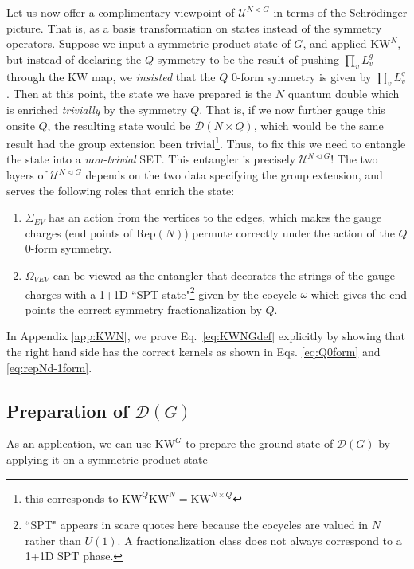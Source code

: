 \documentclass[nofootinbib,prx,twocolumn,showpacs,superscriptaddress,notitlepage,amsmath,amssymb]{revtex4-2}
\theoremstyle{definition}
\def\KW{\text{KW}}
\def\Rep{\text{Rep}}
\begin{document}
Let us now offer a complimentary viewpoint of $\mathcal U^{N \triangleleft G}$ in terms of the Schr\"odinger picture. That is, as a basis transformation on states instead of the symmetry operators. Suppose we input a symmetric product state of $G$, and applied $\KW^N$, but instead of declaring the $Q$ symmetry to be the result of pushing $\prod_v L^g_v$ through the KW map, we \textit{insisted} that the $Q$ 0-form symmetry is given by $\prod_v L^q_v$. Then at this point, the state we have prepared is the $N$ quantum double which is enriched \textit{trivially} by the symmetry $Q$. That is, if we now further gauge this onsite $Q$, the resulting state would be $\mathcal D(N\times Q)$, which would be the same result had the group extension been trivial\footnote{this corresponds to $\KW^Q\KW^N = \KW^{N \times Q}$}. Thus, to fix this we need to entangle the state into a \textit{non-trivial} SET. This entangler is precisely $\mathcal U^{N \triangleleft G}$! The two layers of $\mathcal U^{N \triangleleft G}$ depends on the two data specifying the group extension, and serves the following roles that enrich the state:
\begin{enumerate}
\item $\Sigma_{EV}$ has an action from the vertices to the edges, which makes the gauge charges (end points of $\Rep(N)$) permute correctly under the action of the $Q$ 0-form symmetry.
\item $\Omega_{VEV}$ can be viewed as the entangler that decorates the strings of the gauge charges with a 1+1D ``SPT state"\footnote{``SPT" appears in scare quotes here because the cocycles are valued in $N$ rather than $U(1)$. A fractionalization class does not always correspond to a 1+1D SPT phase.} given by the cocycle $\omega$ which gives the end points the correct symmetry fractionalization by $Q$.
\end{enumerate}


In Appendix \ref{app:KWN}, we prove Eq.~\eqref{eq:KWNGdef} explicitly by showing that the right hand side has the correct kernels as shown in Eqs. \eqref{eq:Q0form} and \eqref{eq:repNd-1form}.



\subsection{Preparation of $\mathcal D(G)$}\label{sec:QDprep}

As an application, we can use $\KW^G$ to prepare the ground state of $\mathcal D(G)$ by applying it on a symmetric product state~\cite{Brell2015,Yoshida17}
\end{document}
